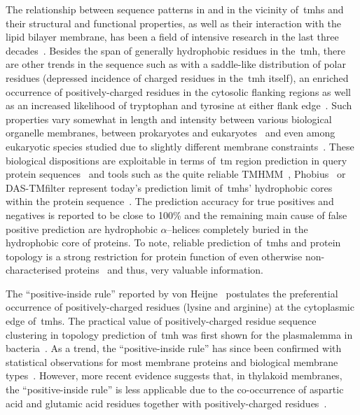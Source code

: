 The relationship between sequence patterns in and in the vicinity of~\gls{tmh}s and their structural and functional properties, as well as their interaction with the lipid bilayer membrane, has been a field of intensive research in the last three decades~\cite{Ladokhin2015}.
Besides the span of generally hydrophobic residues in the~\gls{tmh}, there are other trends in the sequence such as with a saddle-like distribution of polar residues (depressed incidence of charged residues in the~\gls{tmh}  itself), an enriched occurrence of positively\--charged residues in the cytosolic flanking regions as well as an increased likelihood of tryptophan and tyrosine at either flank edge~\cite{Sharpe2010, VonHeijne1986,VonHeijne1988,VonHeijne1989, Baeza-Delgado2013, Granseth2005}.
Such properties vary somewhat in length and intensity between various biological organelle membranes, between prokaryotes and eukaryotes~\cite{Ojemalm2013} and even among eukaryotic species studied due to slightly different membrane constraints~\cite{Sharpe2010, Pogozheva2013}.
These biological dispositions are exploitable in terms of~\gls{tm} region prediction in query protein sequences~\cite{Beuming2004, Zhao2006} and tools such as the quite reliable TMHMM~\cite{Krogh2001,Sonnhammer1998}, Phobius~\cite{Kall2004, Kall2007} or DAS-TMfilter represent today’s prediction limit of~\gls{tmh}s’ hydrophobic cores within the protein sequence~\cite{Cserzo2002, Cserzo2004, Kall2002}.
The prediction accuracy for true positives and negatives is reported to be close to 100\% and the remaining main cause of false positive prediction are hydrophobic \(\alpha\)--helices completely buried in the hydrophobic core of proteins.
 To note, reliable prediction of~\gls{tmh}s and protein topology is a strong restriction for protein function of even otherwise non\--characterised proteins~\cite{Eisenhaber2016, Eisenhaber2012, Sherman2015} and thus, very valuable information.

The ``positive\--inside rule'' reported by von Heijne~\cite{VonHeijne2006, VonHeijne1989} postulates the preferential occurrence of positively\--charged residues (lysine and arginine) at the cytoplasmic edge of~\gls{tmh}s.
The practical value of positively\--charged residue sequence clustering in topology prediction of~\gls{tmh} was first shown for the plasmalemma in bacteria~\cite{VonHeijne1989, Sipos1993}.
As a trend, the ``positive-inside rule'' has since been confirmed with statistical observations for most membrane proteins and biological membrane types~\cite{Baeza-Delgado2013, Gavel1991, Nilsson2005a, Wallin1998}.
However, more recent evidence suggests that, in thylakoid membranes, the ``positive-inside rule'' is less applicable due to the co-occurrence of aspartic acid and glutamic acid residues together with positively\--charged residues~\cite{Pogozheva2013}.

